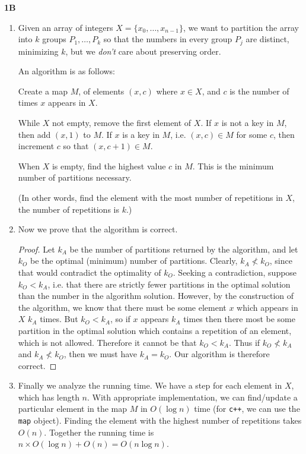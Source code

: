 \documentclass[11pt]{article}
\begin{document}
\textbf{1B}
\begin{enumerate}
\item Given an array of integers $X = \{x_0, \dots, x_{n-1}\}$, we want to partition the array into $k$ groups $P_1, \dots, P_k$ so that the numbers in every group $P_j$ are distinct, minimizing $k$, but we \textit{don't} care about preserving order. 

An algorithm is as follows:

Create a map $M$, of elements $(x, c)$ where $x \in X$, and $c$ is the number of times $x$ appears in $X$.  

While $X$ not empty, remove the first element of $X$. If $x$ is not a key in $M$, then add $(x, 1)$ to $M$. If $x$ is a key in $M$, i.e. $(x, c) \in M$ for some $c$, then increment $c$ so that $(x, c+1) \in M$. 

When $X$ is empty, find the highest value $c$ in $M$. This is the minimum number of partitions necessary.

(In other words, find the element with the most number of repetitions in $X$, the number of repetitions is $k$.)

\item Now we prove that the algorithm is correct.

\begin{proof}
Let $k_A$ be the number of partitions returned by the algorithm, and let $k_O$ be the optimal (minimum) number of partitions. Clearly, $k_A \not<k_O$, since that would contradict the optimality of $k_O$. Seeking a contradiction, suppose $k_O<k_A$, i.e. that there are strictly fewer partitions in the optimal solution than the number in the algorithm solution. However, by the construction of the algorithm, we know that there must be some element $x$ which appears in $X$ $k_A$ times. But $k_O<k_A$, so if $x$ appears $k_A$ times then there most be some partition in the optimal solution which contains a repetition of an element, which is not allowed. Therefore it cannot be that $k_O<k_A$.  Thus if $k_O \not<k_A$ and $k_A \not<k_O$, then we must have $k_A = k_O$. Our algorithm is therefore correct.
\end{proof}

\item Finally we analyze the running time. We have a step for each element in $X$, which has length $n$. With appropriate implementation, we can find/update a particular element in the map $M$ in $O(\log n)$ time (for \verb|c++|, we can use the \verb|map| object). Finding the element with the highest number of repetitions takes $O(n)$. Together the running time is $n\times O(\log n) + O(n) = O(n\log n)$. 
\end{enumerate}
\end{document}
